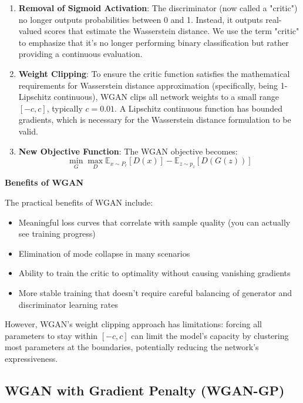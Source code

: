 \begin{enumerate}
    \item \textbf{Removal of Sigmoid Activation}: The discriminator (now called a "critic") no longer outputs probabilities between 0 and 1. Instead, it outputs real-valued scores that estimate the Wasserstein distance. We use the term "critic" to emphasize that it's no longer performing binary classification but rather providing a continuous evaluation.
    
    \item \textbf{Weight Clipping}: To ensure the critic function satisfies the mathematical requirements for Wasserstein distance approximation (specifically, being 1-Lipschitz continuous), WGAN clips all network weights to a small range $[-c, c]$, typically $c = 0.01$. A Lipschitz continuous function has bounded gradients, which is necessary for the Wasserstein distance formulation to be valid.
    
    \item \textbf{New Objective Function}: The WGAN objective becomes:
    \begin{equation}
    \min_G \max_D \mathbb{E}_{x \sim P_r}[D(x)] - \mathbb{E}_{z \sim p_z}[D(G(z))]
    \end{equation}
\end{enumerate}

\textbf{Benefits of WGAN}

The practical benefits of WGAN include:
\begin{itemize}
    \item Meaningful loss curves that correlate with sample quality (you can actually see training progress)
    \item Elimination of mode collapse in many scenarios
    \item Ability to train the critic to optimality without causing vanishing gradients
    \item More stable training that doesn't require careful balancing of generator and discriminator learning rates
\end{itemize}

However, WGAN's weight clipping approach has limitations: forcing all parameters to stay within $[-c, c]$ can limit the model's capacity by clustering most parameters at the boundaries, potentially reducing the network's expressiveness.

\subsection{WGAN with Gradient Penalty (WGAN-GP)}

